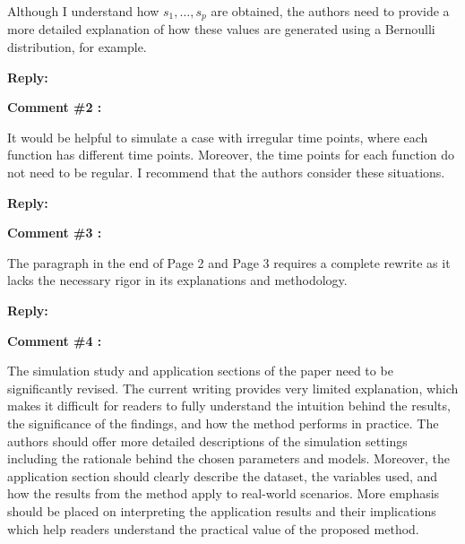 \documentclass[11pt]{article}
\begin{document}
Although I understand how $s_1, \dots , s_p$ are obtained, the authors need to provide a more detailed explanation of how these values are generated using a Bernoulli distribution, for example.

\medskip

\normalfont

\textbf{Reply:} 


\bigskip

\itshape

\textbf{Comment \#2 :}

It would be helpful to simulate a case with irregular time points, where each function has different time points. Moreover, the time points for each function do not need to be regular. I recommend that the authors consider these situations.

\medskip

\normalfont

\textbf{Reply:}


\bigskip

\itshape


\textbf{Comment \#3 :}

The paragraph in the end of Page 2 and Page 3 requires a complete rewrite as it lacks the necessary rigor in its explanations and methodology.

\medskip

\normalfont

\textbf{Reply:}



\bigskip


\itshape


\textbf{Comment \#4 :}

The simulation study and application sections of the paper need to be significantly revised. The current writing provides very limited explanation, which makes it difficult for readers to fully understand the intuition behind the results, the significance of the findings, and how the method performs in practice. The authors should offer more detailed descriptions of the simulation settings including the rationale behind the chosen parameters and models. Moreover, the application section should clearly describe the dataset, the variables used, and how the results from the method apply to real-world scenarios. More emphasis should be placed on interpreting the application results and their implications which help readers understand the practical value of the proposed method.


\medskip

\normalfont
\end{document}
